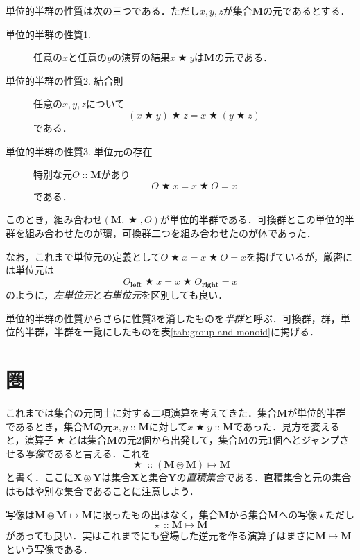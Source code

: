 \documentclass[twocolumn]{jsbook}
\newcommand{\keyword}[1]{{\emph{#1}}}
\newcommand{\mathKeyword}[1]{\mathbf{#1}}
\DeclareMathOperator{\mathAnyBinaryOperator}{\bigstar}
\DeclareMathOperator{\mathAnyUnaryOperator}{\star}
\DeclareMathOperator{\mathIn}{::}
\DeclareMathOperator{\mathMapsTo}{\mapsto}
\DeclareMathOperator{\mathSetTimes}{\circledast}
\newcommand{\mathLeft}{\mathKeyword{left}}
\newcommand{\mathRight}{\mathKeyword{right}}
\newcommand{\mathSet}[1]{\mathbf{#1}}
\newcommand{\mathMorph}[2]{#1\mathMapsTo#2}
\newcommand{\mathMonoid}[3]{(#1,#2,#3)}
\begin{document}
単位的半群の性質は次の三つである．ただし$x,y,z$が集合$\mathSet{M}$の元であるとする．
\begin{description}
\item[単位的半群の性質1.] 任意の$x$と任意の$y$の演算の結果$x\mathAnyBinaryOperator y$は$\mathSet{M}$の元である．
\item[単位的半群の性質2. 結合則] 任意の$x,y,z$について$$(x\mathAnyBinaryOperator y)\mathAnyBinaryOperator z=x\mathAnyBinaryOperator(y\mathAnyBinaryOperator z)$$である．
\item[単位的半群の性質3. 単位元の存在] 特別な元$O\mathIn\mathSet{M}$があり$$O\mathAnyBinaryOperator x=x\mathAnyBinaryOperator O=x$$である．
\end{description}
このとき，組み合わせ$\mathMonoid{\mathSet{M}}{\mathAnyBinaryOperator}{O}$が単位的半群である．可換群とこの単位的半群を組み合わせたのが環，可換群二つを組み合わせたのが体であった．

なお，これまで単位元の定義として$O\mathAnyBinaryOperator x=x\mathAnyBinaryOperator O=x$を掲げているが，厳密には単位元は$$O_\mathLeft\mathAnyBinaryOperator x=x\mathAnyBinaryOperator O_\mathRight=x$$のように，\keyword{左単位元}と\keyword{右単位元}を区別しても良い．

単位的半群の性質からさらに性質3を消したものを\keyword{半群}と呼ぶ．可換群，群，単位的半群，半群を一覧にしたものを表\ref{tab:group-and-monoid}に掲げる．

\section{圏}

これまでは集合の元同士に対する二項演算を考えてきた．集合$\mathSet{M}$が単位的半群であるとき，集合$\mathSet{M}$の元$x,y\mathIn\mathSet{M}$に対して$x\mathAnyBinaryOperator y\mathIn\mathSet{M}$であった．見方を変えると，演算子$\mathAnyBinaryOperator$とは集合$\mathSet{M}$の元2個から出発して，集合$\mathSet{M}$の元1個へとジャンプさせる\keyword{写像}であると言える．これを$$\mathAnyBinaryOperator\mathIn{}\mathMorph{(\mathSet{M}\mathSetTimes\mathSet{M})}{\mathSet{M}}$$と書く．ここに$\mathSet{X}\mathSetTimes\mathSet{Y}$は集合$\mathSet{X}$と集合$\mathSet{Y}$の\keyword{直積集合}である．直積集合と元の集合はもはや別な集合であることに注意しよう．

写像は$\mathMorph{\mathSet{M}\mathSetTimes\mathSet{M}}{\mathSet{M}}$に限ったもの出はなく，集合$\mathSet{M}$から集合$\mathSet{M}$への写像$\mathAnyUnaryOperator$ただし$$\mathAnyUnaryOperator\mathIn\mathMorph{\mathSet{M}}{\mathSet{M}}$$があっても良い．実はこれまでにも登場した逆元を作る演算子はまさに$\mathMorph{\mathSet{M}}{\mathSet{M}}$という写像である．
\end{document}
